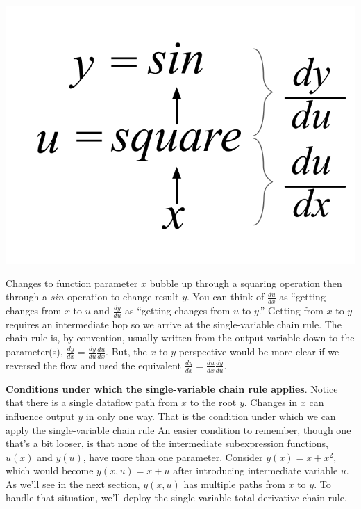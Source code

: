 \documentclass[11pt]{article}
\begin{document}
\includegraphics[scale=.9]{sin-square.png}

Changes to function parameter $x$ bubble up through a squaring operation then through a $sin$ operation to change result $y$. You can think of $\frac{du}{dx}$ as ``getting changes from $x$ to $u$ and $\frac{dy}{du}$ as ``getting changes from $u$ to $y$.'' Getting from $x$ to $y$ requires an intermediate hop so we arrive at the single-variable chain rule. The chain rule is, by convention, usually written from the output variable down to the parameter(s), $\frac{dy}{dx} = \frac{dy}{du} \frac{du}{dx}$. But, the $x$-to-$y$ perspective would be more clear if we reversed the flow and used the equivalent $\frac{dy}{dx} = \frac{du}{dx}\frac{dy}{du}$.

{\bf Conditions under which the single-variable chain rule applies}. Notice that there is a single dataflow path from $x$ to the root $y$.  Changes in $x$ can influence output $y$ in only one way.  That is the condition under which we can apply the single-variable chain rule An easier condition to remember, though one that's a bit looser, is that none of the intermediate subexpression functions, $u(x)$ and $y(u)$, have more than one parameter.  Consider $y(x) = x+x^2$, which would become $y(x,u) = x+u$ after introducing intermediate variable $u$.  As we'll see in the next section, $y(x,u)$ has multiple paths from $x$ to $y$. To handle that situation, we'll deploy the single-variable total-derivative chain rule.
	
\end{document}
